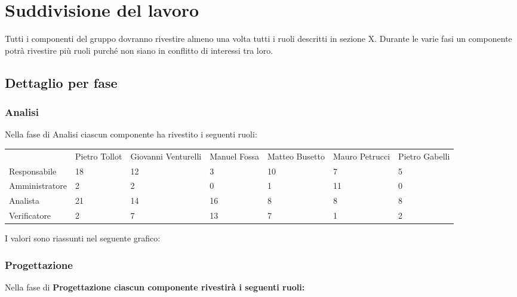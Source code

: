 \section{Suddivisione del lavoro}

Tutti i componenti del gruppo dovranno rivestire almeno una volta tutti i ruoli descritti in sezione X.
Durante le varie fasi un componente potr\`{a} rivestire pi\`{u} ruoli purch\'{e} non siano in conflitto di interessi tra loro.

\subsection{Dettaglio per fase}


\subsubsection{Analisi}
Nella fase di Analisi ciascun componente ha rivestito i seguenti ruoli:

\begin{table}[h] %
\begin{tabular}{lllllll}
               & Pietro Tollot & Giovanni Venturelli & Manuel Fossa & Matteo Busetto & Mauro Petrucci & Pietro Gabelli \\
Responsabile   & 18            & 12                  & 3            & 10             & 7              & 5              \\
Amministratore & 2             & 2                  & 0            & 1              & 11             & 0              \\
Analista       & 21            & 14                  & 16           & 8              & 8              & 8              \\
Verificatore   & 2             & 7                   & 13           & 7              & 1              & 2             
\end{tabular}
\end{table}

I valori sono riassunti nel seguente grafico:


\subsubsection{Progettazione}
Nella fase di \bf{Progettazione} ciascun componente rivestir\`{a} i seguenti ruoli:

